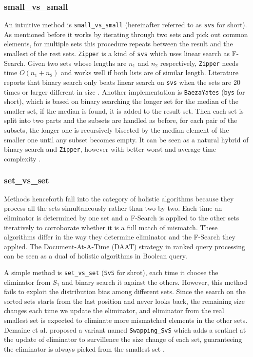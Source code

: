 \documentclass[runningheads,a4paper]{llncs}
\begin{document}
\subsubsection{small\_vs\_small}
An intuitive method is \texttt{small\_vs\_small} (hereinafter referred to as \texttt{svs} for short).
As mentioned before it works by iterating through two sets and pick out common elements, for multiple sets this procedure repeats between the result and the smallest of the rest sets.
\texttt{Zipper} is a kind of \texttt{svs} which uses linear search as F-Search.
Given two sets whose lengths are $ n_1 $ and $ n_2 $ respectively, \texttt{Zipper} needs time $ O( n_1 + n_2 ) $ and works well if both lists are of similar length.
Literature reports that binary search only beats linear search on \texttt{svs} when the sets are 20 times or larger different in size \cite{navarro2010dual,Sanders2007Intersection}.
Another implementation is \texttt{BaezaYates} (\texttt{bys} for short), which is based on binary searching the longer set for the median of the smaller set, if the median is found, it is added to the result set.
Then each set is split into two parts and the subsets are handled as before, for each pair of the subsets, the longer one is recursively bisected by the median element of the smaller one until any subset becomes empty.
It can be seen as a natural hybrid of binary search and \texttt{Zipper}, however with better worst and average time complexity \cite{Baeza2010Fast}.
\subsubsection{set\_vs\_set}
Methods henceforth fall into the category of holistic algorithms because they process all the sets simultaneously rather than two by two.
Each time an eliminator is determined by one set and a F-Search is applied to the other sets iteratively to corroborate whether it is a full match of mismatch.
These algorithms differ in the way they determine eliminator and the F-Search they applied.
The Document-At-A-Time (DAAT) strategy in ranked query processing can be seen as a dual of holistic algorithms in Boolean query.

A simple method is \texttt{set\_vs\_set} (\texttt{SvS} for shrot), each time it choose the eliminator from $ S_1 $ and binary search it against the others.
However, this method fails to exploit the distribution bias among different sets.
Since the search on the sorted sets starts from the last position and never looks back, the remaining size changes each time we update the eliminator, and eliminator from the real smallest set is expected to eliminate more mismatched elements in the other sets.
Demaine et al. proposed a variant named \texttt{Swapping\_SvS} which adds a sentinel at the update of eliminator to survillence the size change of each set, guaranteeing the eliminator is always picked from the smallest set \cite{Demaine2001Experiments}.
\end{document}

